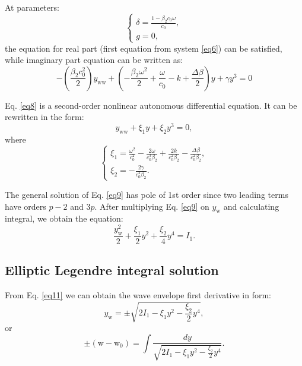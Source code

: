 \documentclass{article}
\begin{document}
        At parameters:
        \begin{equation} \label{eq7}
            \begin{cases}
                \displaystyle \delta = \frac{1-\beta_{2} c_{0} \omega}{c_{0}},\\
                \displaystyle g = 0,
            \end{cases}
        \end{equation}
        the equation for real part (first equation from system \ref{eq6}) can be satisfied, while imaginary part equation can be written as:
        \begin{equation} \label{eq8}
            -\left(\frac{\beta_{2} c_{0}^{2}}{2} \right)y_{\mathrm{ww}} + \left(-\frac{\beta_{2} \omega^{2}}{2}+\frac{\omega}{c_{0}}-k +\frac{\Delta \beta}{2}\right) y + \gamma  y^{3} =0
        \end{equation}

        Eq. \ref{eq8} is a second-order nonlinear autonomous differential equation. It can be rewritten in the form:
        \begin{equation} \label{eq9}
            y_{\mathrm{ww}} + \xi_{1} y + \xi_{2} y^3 = 0,
        \end{equation}
        where
        \begin{equation} \label{eq10}
            \begin{cases}
                \displaystyle \xi_{1} =
                \frac{\omega^{2}}{c_{0}^{2}}
                -\frac{2 \omega}{c_{0}^{3} \beta_{2}}
                +\frac{2 k}{c_{0}^{2} \beta_{2}}
                -\frac{\Delta \beta}{c_{0}^{2} \beta_{2}},\\
                \displaystyle \xi_{2} = -\frac{2 \gamma}{c_{0}^{2} \beta_{2}}.
            \end{cases}
        \end{equation}

        The general solution of Eq. \ref{eq9} has pole of 1st order since two leading terms have orders \(p-2\) and \(3p\). After multiplying Eq. \ref{eq9} on \(y_{\mathrm{w}}\) and calculating integral, we obtain the equation:
        \begin{equation} \label{eq11}
            \frac{y^2_{\mathrm{w}}}{2} + \frac{\xi_{1}}{2} y^2 + \frac{\xi_{2}}{4} y^4 = I_{1}.
        \end{equation}

        \subsection{Elliptic Legendre integral solution}
            From Eq. \ref{eq11} we can obtain the wave envelope first derivative in form:
            \begin{equation} \label{eq12}
                y_{\mathrm{w}} = \pm \sqrt{2I_{1} - \xi_{1}y^2-\frac{\xi_{2}}{2}y^4},
            \end{equation}
            or
            \begin{equation} \label{eq13}
                \pm \left(\mathrm{w} - \mathrm{w}_{0}\right) = \int \frac{dy}{ \sqrt{2I_{1} - \xi_{1}y^2-\frac{\xi_{2}}{2}y^4}}.
            \end{equation}
\end{document}
